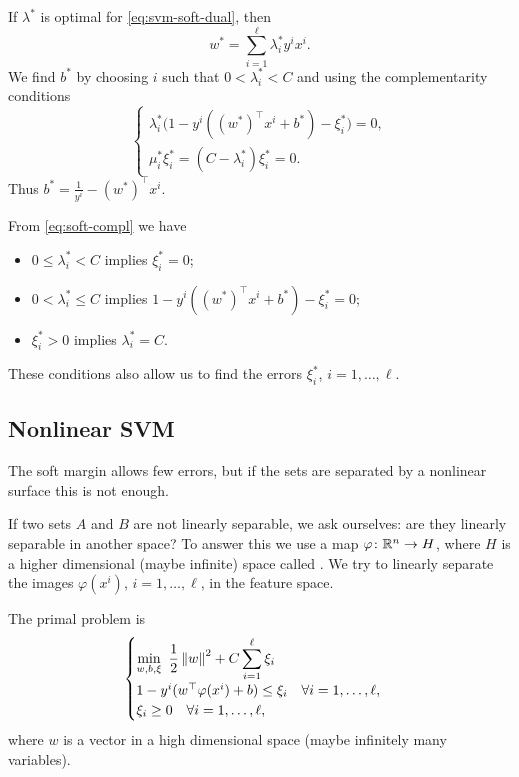 If $\lambda^*$ is optimal for \cref{eq:svm-soft-dual}, then
\[
    w^* = \sum_{i=1}^{\ell} \lambda^*_i y^i x^i.
\]
We find $b^*$ by choosing $i$ such that $0 < \lambda^*_i < C$ and using the complementarity conditions
\begin{equation}
    \begin{cases}
        \lambda^*_i \bigl(1 - y^i ((w^*)^\top x^i + b^*) - \xi^*_i\bigr) = 0, \\
        \mu^*_i \xi^*_i = (C - \lambda^*_i) \xi^*_i = 0.
    \end{cases}
    \label{eq:soft-compl}
\end{equation}
Thus $b^* = \frac{1}{y^i} - (w^*)^\top x^i$.

\begin{remark}
    From \cref{eq:soft-compl} we have
    \begin{itemize}
        \item $0 \le \lambda^*_i < C$ implies $\xi^*_i = 0$;
        \item $0 < \lambda^*_i \le C$ implies $1 - y^i ((w^*)^\top x^i + b^*) - \xi^*_i = 0$;
        \item $\xi^*_i > 0$ implies $\lambda^*_i = C$.
    \end{itemize}
    These conditions also allow us to find the errors $\xi^*_i$, $i = 1, \dots, \ell$.
\end{remark}

\subsection{Nonlinear SVM}

The soft margin allows few errors, but if the sets are separated by a nonlinear surface this is not enough.

If two sets $A$ and $B$ are not linearly separable, we ask ourselves: are they linearly separable in another space? To answer this we use a map $\varphi \colon \mathbb{R}^n \to H$, where $H$ is a higher dimensional (maybe infinite) space called . We try to linearly separate the images $\varphi(x^i)$, $i = 1, \dots, \ell$, in the feature space.

The primal problem is
\begin{equation}
    \begin{cases}
        \displaystyle \min_{w, b, \xi} \ \frac{1}{2} \left\lVert w \right\rVert^2 + C \sum_{i=1}^{\ell} \xi_i \\
        1 - y^i (w^\top \varphi(x^i) + b) \le \xi_i \quad \forall i = 1, \dots, \ell, \\
        \xi_i \ge 0 \quad \forall i = 1, \dots, \ell,
    \end{cases}
    \label{eq:svm-nl-primal}
\end{equation}
where $w$ is a vector in a high dimensional space (maybe infinitely many variables).

